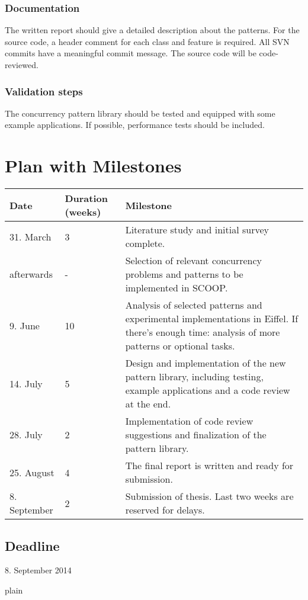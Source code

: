 \documentclass[a4paper,10pt]{article}
\begin{document}
\subsubsection {Documentation}
The written report should give a detailed description about the patterns. For the source code, a header comment for each class and feature is required. All SVN commits have a meaningful commit message. The source code will be code-reviewed.
\subsubsection {Validation steps}
The concurrency pattern library should be tested and equipped with some example applications. If possible, performance tests should be included.

\section{Plan with Milestones}
\label {sec:plan-with-milestones}

\begin{center}
\renewcommand{\arraystretch}{1.5}
\begin{tabular}{l p{1.5cm} p{7cm}}

Date & Duration (weeks) & Milestone\\ \hline

31. March & 3 & Literature study and initial survey complete.\\

afterwards & - & Selection of relevant concurrency problems and patterns to be implemented in SCOOP.\\

9. June & 10 & Analysis of selected patterns and experimental implementations in Eiffel. If there’s enough time: analysis of more patterns or optional tasks. \\

14. July & 5 & Design and implementation of the new pattern library, including testing, example applications and a code review at the end. \\

28. July & 2 & Implementation of code review suggestions and finalization of the pattern library. \\

25. August & 4 & The final report is written and ready for submission.\\

8. September & 2 & Submission of thesis. Last two weeks are reserved for delays.\\

\end{tabular}
\end{center}

\subsection{Deadline}
8. September 2014

\begin{flushleft}
 {plain}

\end{flushleft}
\end{document}
